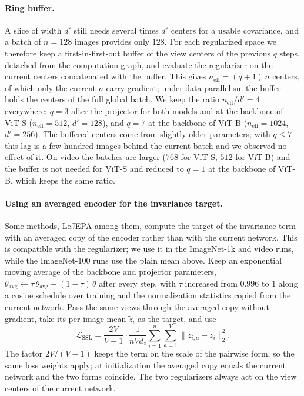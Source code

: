 \paragraph{Ring buffer.}
A slice of width $d'$ still needs several times $d'$ centers for a usable covariance, and a batch of $n=128$ images provides only $128$. For each regularized space we therefore keep a first-in-first-out buffer of the view centers of the previous $q$ steps, detached from the computation graph, and evaluate the regularizer on the current centers concatenated with the buffer. This gives $n_{\mathrm{eff}}=(q+1)\,n$ centers, of which only the current $n$ carry gradient; under data parallelism the buffer holds the centers of the full global batch. We keep the ratio $n_{\mathrm{eff}}/d'=4$ everywhere: $q=3$ after the projector for both models and at the backbone of ViT-S ($n_{\mathrm{eff}}=512$, $d'=128$), and $q=7$ at the backbone of ViT-B ($n_{\mathrm{eff}}=1024$, $d'=256$). The buffered centers come from slightly older parameters; with $q\le 7$ this lag is a few hundred images behind the current batch and we observed no effect of it. On video the batches are larger ($768$ for ViT-S, $512$ for ViT-B) and the buffer is not needed for ViT-S and reduced to $q=1$ at the backbone of ViT-B, which keeps the same ratio.

\paragraph{Using an averaged encoder for the invariance target.}
Some methods, LeJEPA among them, compute the target of the invariance term with an averaged copy of the encoder rather than with the current network. This is compatible with the regularizer; we use it in the ImageNet-1k and video runs, while the ImageNet-100 runs use the plain mean above. Keep an exponential moving average of the backbone and projector parameters, $\theta_{\mathrm{avg}}\leftarrow\tau\,\theta_{\mathrm{avg}}+(1-\tau)\,\theta$ after every step, with $\tau$ increased from $0.996$ to $1$ along a cosine schedule over training and the normalization statistics copied from the current network. Pass the same views through the averaged copy without gradient, take its per-image mean $\tilde z_i$ as the target, and use
\[
\mathcal L_{\mathrm{SSL}}
=
\frac{2V}{V-1}\cdot\frac{1}{n V d_z}\sum_{i=1}^{n}\sum_{a=1}^{V}\|z_{i,a}-\tilde z_i\|_2^2 .
\]
The factor $2V/(V-1)$ keeps the term on the scale of the pairwise form, so the same loss weights apply; at initialization the averaged copy equals the current network and the two forms coincide. The two regularizers always act on the view centers of the current network.
